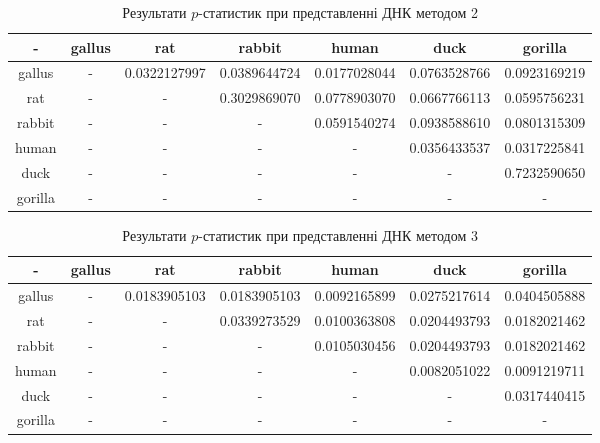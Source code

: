 \documentclass[14pt]{extarticle}
\begin{document}
\begin{table}[h!]
\begin{center}
\begin{tabular}{|c|c|c|c|c|c|c|}
\hline
- & gallus & rat & rabbit & human & duck & gorilla \\ \hline
gallus & - & 0.0322127997 & 0.0389644724 & 0.0177028044 & 0.0763528766 & 0.0923169219 \\ \hline
rat & - & - & 0.3029869070 & 0.0778903070 & 0.0667766113 & 0.0595756231 \\ \hline
rabbit & - & - & - & 0.0591540274 & 0.0938588610 & 0.0801315309 \\ \hline
human & - & - & - & - & 0.0356433537 & 0.0317225841 \\ \hline
duck & - & - & - & - & - & 0.7232590650 \\ \hline
gorilla & - & - & - & - & - & - \\ \hline
\end{tabular}
\end{center}
\caption{Результати $p$-статистик при представленні ДНК методом 2}
\label{table:res2}
\end{table}

\begin{table}[h!]
\begin{center}
\begin{tabular}{|c|c|c|c|c|c|c|}
\hline
- & gallus & rat & rabbit & human & duck & gorilla \\ \hline
gallus & - & 0.0183905103 & 0.0183905103 & 0.0092165899 & 0.0275217614 & 0.0404505888 \\ \hline
rat & - & - & 0.0339273529 & 0.0100363808 & 0.0204493793 & 0.0182021462 \\ \hline
rabbit & - & - & - & 0.0105030456 & 0.0204493793 & 0.0182021462 \\ \hline
human & - & - & - & - & 0.0082051022 & 0.0091219711 \\ \hline
duck & - & - & - & - & - & 0.0317440415 \\ \hline
gorilla & - & - & - & - & - & - \\ \hline
\end{tabular}
\end{center}
\caption{Результати $p$-статистик при представленні ДНК методом 3}
\label{table:res3}
\end{table}
\end{document}
